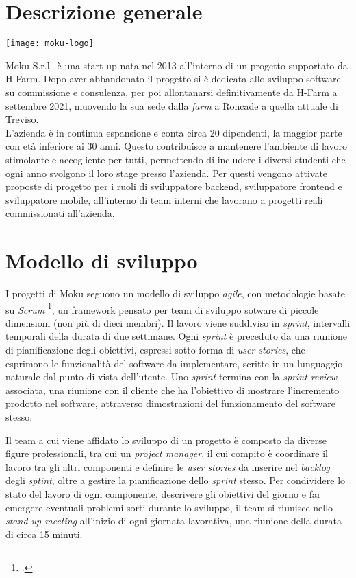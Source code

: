 \section{Descrizione generale}

\begin{center}
	\texttt{[image: moku-logo]}
\end{center}

\noindent Moku S.r.l.\ è una start-up nata nel 2013 all'interno di un progetto supportato da H-Farm. Dopo aver abbandonato il progetto si è dedicata allo sviluppo software su commissione e consulenza, per poi allontanarsi definitivamente da H-Farm a settembre 2021, muovendo la sua sede dalla \emph{farm} a Roncade a quella attuale di Treviso. \\
L'azienda è in continua espansione e conta circa 20 dipendenti, la maggior parte con età inferiore ai 30 anni. Questo contribuisce a mantenere l'ambiente di lavoro stimolante e accogliente per tutti, permettendo di includere i diversi studenti che ogni anno svolgono il loro stage presso l'azienda. Per questi vengono attivate proposte di progetto per i ruoli di sviluppatore backend, sviluppatore frontend e sviluppatore mobile, all'interno di team interni che lavorano a progetti reali commissionati all'azienda.

\section{Modello di sviluppo}
I progetti di Moku seguono un modello di sviluppo \emph{agile}, con metodologie basate su \emph{Scrum} \footcite{site:scrum-guide}, un framework pensato per team di sviluppo sotware di piccole dimensioni (non più di dieci membri).
Il lavoro viene suddiviso in \emph{sprint}, intervalli temporali della durata di due settimane. Ogni \emph{sprint} è preceduto da una riunione di pianificazione degli obiettivi, espressi sotto forma di \emph{user stories}, che esprimono le funzionalità del software da implementare, scritte in un lunguaggio naturale dal punto di vista dell'utente. Uno \emph{sprint} termina con la \emph{sprint review} associata, una riunione con il cliente che ha l'obiettivo di mostrare l'incremento prodotto nel software, attraverso dimostrazioni del funzionamento del software stesso.

Il team a cui viene affidato lo sviluppo di un progetto è composto da diverse figure professionali, tra cui un \emph{project manager}, il cui compito è coordinare il lavoro tra gli altri componenti e definire le \emph{user stories} da inserire nel \emph{backlog} degli \emph{sptint}, oltre a gestire la pianificazione dello \emph{sprint} stesso. Per condividere lo stato del lavoro di ogni componente, descrivere gli obiettivi del giorno e far emergere eventuali problemi sorti durante lo sviluppo, il team si riunisce nello \emph{stand-up meeting} all'inizio di ogni giornata lavorativa, una riunione della durata di circa 15 minuti.

